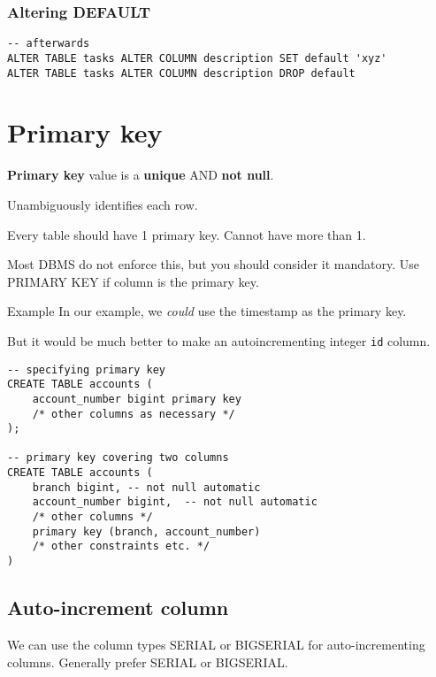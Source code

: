 \documentclass[slides]{pgnotes}
\begin{document}
\newpage
\subsubsection{Altering DEFAULT}

\begin{verbatim}
-- afterwards
ALTER TABLE tasks ALTER COLUMN description SET default 'xyz'
ALTER TABLE tasks ALTER COLUMN description DROP default
\end{verbatim}


\section{Primary key}
\label{sec:primary-key}

\textbf{Primary key} value is a \textbf{unique} AND \textbf{not null}.

Unambiguously identifies each row.

Every table should have 1 primary key.
Cannot have more than 1. 

Most DBMS do not enforce this, but you should consider it mandatory.
Use PRIMARY KEY if column is the primary key. 

\begin{greenbox}{Example}
  In our example, we \textit{could} use the timestamp as the primary key.

  But it would be much better to make an autoincrementing integer \texttt{id} column.
\end{greenbox}

\newpage

\begin{verbatim}
-- specifying primary key
CREATE TABLE accounts ( 
    account_number bigint primary key
    /* other columns as necessary */
);

-- primary key covering two columns
CREATE TABLE accounts (
    branch bigint, -- not null automatic
    account_number bigint,  -- not null automatic
    /* other columns */
    primary key (branch, account_number)
    /* other constraints etc. */
)
\end{verbatim}

\subsection{Auto-increment column}
\label{sec:auto-increment-column}

We can use the column types SERIAL or BIGSERIAL for auto-incrementing columns.
Generally prefer SERIAL or BIGSERIAL.
\end{document}
